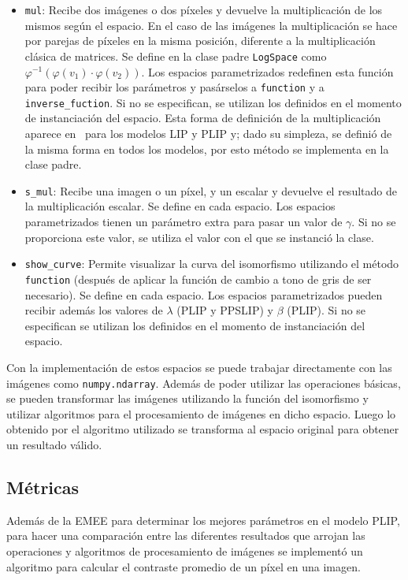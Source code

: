 \begin{itemize}
	\item \verb|mul|: Recibe dos im\'agenes o dos p\'ixeles y devuelve la multiplicaci\'on de los mismos seg\'un el espacio. En el caso de las im\'agenes la multiplicaci\'on se hace por parejas de p\'ixeles en la misma posici\'on, diferente a la multiplicaci\'on cl\'asica de matrices. Se define en la clase padre \verb|LogSpace| como $\varphi^{-1}(\varphi(v_1)\cdot\varphi(v_2))$. Los espacios parametrizados redefinen esta funci\'on para poder recibir los par\'ametros y pas\'arselos a \verb|function| y a \verb|inverse_fuction|. Si no se especifican, se utilizan los definidos en el momento de instanciaci\'on del espacio. Esta forma de definici\'on de la multiplicaci\'on aparece en~\cite{panetta2010parameterized} para los modelos LIP y PLIP y; dado su simpleza, se defini\'o de la misma forma en todos los modelos, por esto m\'etodo se implementa en la clase padre.
	\item \verb|s_mul|: Recibe una imagen o un p\'ixel, y un escalar y devuelve el resultado de la multiplicaci\'on escalar. Se define en cada espacio. Los espacios parametrizados tienen un par\'ametro extra para pasar un valor de $\gamma$. Si no se proporciona este valor, se utiliza el valor con el que se instanci\'o la clase.
	\item \verb|show_curve|: Permite visualizar la curva del isomorfismo utilizando el m\'etodo \verb|function| (despu\'es de aplicar la funci\'on de cambio a tono de gris de ser necesario). Se define en cada espacio. Los espacios parametrizados pueden recibir adem\'as los valores de $\lambda$ (PLIP y PPSLIP) y $\beta$ (PLIP). Si no se especifican se utilizan los definidos en el momento de instanciaci\'on del espacio.
\end{itemize}

Con la implementaci\'on de estos espacios se puede trabajar directamente con las im\'agenes como \verb|numpy.ndarray|. Adem\'as de poder utilizar las operaciones b\'asicas, se pueden transformar las im\'agenes utilizando la funci\'on del isomorfismo y utilizar algoritmos para el procesamiento de im\'agenes en dicho espacio. Luego lo obtenido por el algoritmo utilizado se transforma al espacio original para obtener un resultado v\'alido.

\subsection{M\'etricas}

Adem\'as de la EMEE para determinar los mejores par\'ametros en el modelo PLIP, para hacer una comparaci\'on entre las diferentes resultados que arrojan las operaciones y algoritmos de procesamiento de im\'agenes se implement\'o un algoritmo para calcular el contraste promedio de un p\'ixel en una imagen.

